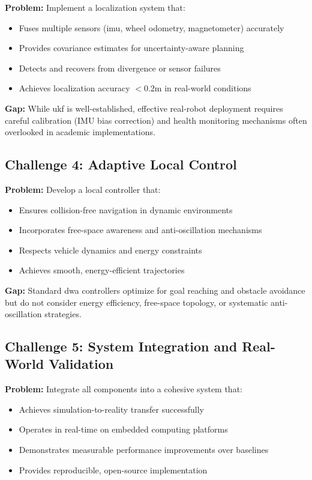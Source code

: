 \textbf{Problem:} Implement a localization system that:
\begin{itemize}
    \item Fuses multiple sensors (\acrshort{imu}, wheel odometry, magnetometer) accurately
    \item Provides covariance estimates for uncertainty-aware planning
    \item Detects and recovers from divergence or sensor failures
    \item Achieves localization accuracy $<$0.2m in real-world conditions
\end{itemize}

\textbf{Gap:} While \acrshort{ukf} is well-established, effective real-robot deployment requires careful calibration (IMU bias correction) and health monitoring mechanisms often overlooked in academic implementations.

\subsection{Challenge 4: Adaptive Local Control}

\textbf{Problem:} Develop a local controller that:
\begin{itemize}
    \item Ensures collision-free navigation in dynamic environments
    \item Incorporates free-space awareness and anti-oscillation mechanisms
    \item Respects vehicle dynamics and energy constraints
    \item Achieves smooth, energy-efficient trajectories
\end{itemize}

\textbf{Gap:} Standard \acrshort{dwa} controllers optimize for goal reaching and obstacle avoidance but do not consider energy efficiency, free-space topology, or systematic anti-oscillation strategies.

\subsection{Challenge 5: System Integration and Real-World Validation}

\textbf{Problem:} Integrate all components into a cohesive system that:
\begin{itemize}
    \item Achieves simulation-to-reality transfer successfully
    \item Operates in real-time on embedded computing platforms
    \item Demonstrates measurable performance improvements over baselines
    \item Provides reproducible, open-source implementation
\end{itemize}

